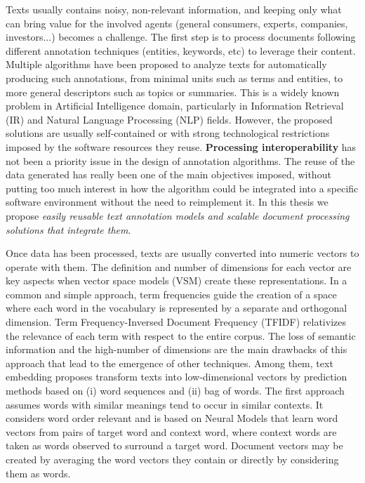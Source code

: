 Texts usually contains noisy, non-relevant information, and keeping only what can bring value for the involved agents (general consumers, experts, companies, investors...) becomes a challenge. The first step is to process documents following different annotation techniques (entities, keywords, etc) to leverage their content. Multiple algorithms have been proposed to analyze texts for automatically producing such annotations, from minimal units such as terms and entities, to more general descriptors such as topics or summaries. This is a widely known problem in Artificial Intelligence domain, particularly in Information Retrieval (IR) and Natural Language Processing (NLP) fields. However, the proposed solutions are usually self-contained or with strong technological restrictions imposed by the software resources they reuse. \textbf{Processing interoperability} has not been a priority issue in the design of annotation algorithms. The reuse of the data generated has really been one of the main objectives imposed, without putting too much interest in how the algorithm could be integrated into a specific software environment without the need to reimplement it. In this thesis we propose \textit{easily reusable text annotation models and scalable document processing solutions that integrate them}. 



Once data has been processed, texts are usually converted into numeric vectors to operate with them. The definition and number of dimensions for each vector are key aspects when vector space models (VSM) create these representations. In a common and simple approach, term frequencies guide the creation of a space where each word in the vocabulary is represented by a separate and orthogonal dimension. Term Frequency-Inversed Document Frequency (TFIDF) relativizes the relevance of each term with respect to the entire corpus. The loss of semantic information and the high-number of dimensions are the main drawbacks of this approach that lead to the emergence of other techniques. Among them, text embedding proposes transform texts into low-dimensional vectors by prediction methods based on (i) word sequences and (ii) bag of words. The first approach assumes words with similar meanings tend to occur in similar contexts. It considers word order relevant and is based on Neural Models that learn word vectors from pairs of target word and context word, where context words are taken as words observed to surround a target word. Document vectors may be created by averaging the word vectors they contain or directly by considering them as words. 



